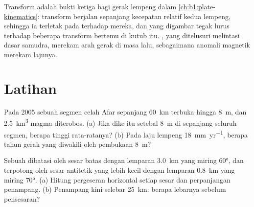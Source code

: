 \begin{omfigure}
\par{}
\label{fig:b1:rifts-ridges-margins:transform}
\end{omfigure}

Transform adalah bukti ketiga bagi gerak lempeng dalam \cref{ch:b1:plate-kinematics}: transform berjalan sepanjang kecepatan relatif kedua lempeng, sehingga ia terletak pada  terhadap  mereka, dan  yang digambar tegak lurus terhadap beberapa transform bertemu di kutub itu. , yang ditelusuri melintasi dasar samudra, merekam arah gerak di masa lalu, sebagaimana anomali magnetik merekam lajunya.

\section{Latihan}

\begin{exercise}[$\star$]\label{exo:b1:rifts-ridges-margins:1}
Pada 2005 sebuah segmen celah Afar sepanjang \qty{60}{km} terbuka hingga \qty{8}{m}, dan \qty{2.5}{km^3} magma diterobos. (a) Jika dike itu setebal \qty{8}{m} di sepanjang seluruh segmen, berapa tinggi rata-ratanya? (b) Pada laju lempeng \qty{18}{mm.yr^{-1}}, berapa tahun gerak yang diwakili oleh pembukaan \qty{8}{m}?
\end{exercise}

\begin{exercise}[$\star$]\label{exo:b1:rifts-ridges-margins:2}
Sebuah  dibatasi oleh sesar batas dengan lemparan \qty{3.0}{km} yang miring \ang{60}, dan terpotong oleh sesar antitetik yang lebih kecil dengan lemparan \qty{0.8}{km} yang miring \ang{70}. (a) Hitung pergeseran horizontal setiap sesar dan perpanjangan penampang. (b) Penampang kini selebar \qty{25}{km}: berapa lebarnya sebelum pensesaran?
\end{exercise}

